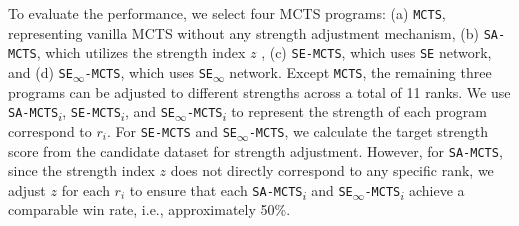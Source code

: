 
%




To evaluate the performance, we select four MCTS programs: (a) \texttt{MCTS}, representing vanilla MCTS without any strength adjustment mechanism, (b) \texttt{SA-MCTS}, which utilizes the strength index $z$ , (c) \texttt{SE-MCTS}, which uses \texttt{SE} network, and (d) \texttt{SE\textsubscript{$\infty$}-MCTS}, which uses \texttt{SE\textsubscript{$\infty$}} network.
Except \texttt{MCTS}, the remaining three programs can be adjusted to different strengths across a total of 11 ranks.
We use \texttt{SA-MCTS\textsubscript{$i$}}, \texttt{SE-MCTS\textsubscript{$i$}}, and \texttt{SE\textsubscript{$\infty$}-MCTS\textsubscript{$i$}} to represent the strength of each program correspond to $r_i$.
For \texttt{SE-MCTS} and \texttt{SE\textsubscript{$\infty$}-MCTS}, we calculate the target strength score from the candidate dataset for strength adjustment.
However, for \texttt{SA-MCTS}, since the strength index $z$ does not directly correspond to any specific rank, we adjust $z$ for each $r_i$ to ensure that each \texttt{SA-MCTS\textsubscript{$i$}} and \texttt{SE\textsubscript{$\infty$}-MCTS\textsubscript{$i$}} achieve a comparable win rate, i.e., approximately 50\%.

